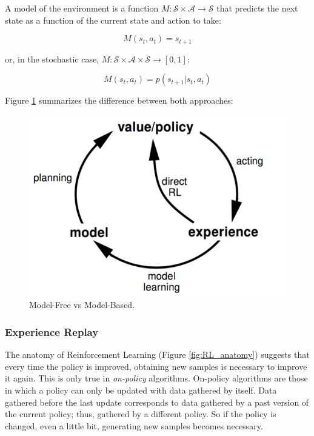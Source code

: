 A model of the environment is a function $M: \mathcal{S} \times \mathcal{A} \to \mathcal{S}$ that predicts the next state as a function of the current state and action to take:

\begin{equation} \label{eq:model}
    M(s_{t},a_{t}) = s_{t+1}  
\end{equation}

or, in the stochastic case, $M: \mathcal{S} \times \mathcal{A} \times \mathcal{S} \to [0, 1]$:

\begin{equation}
    M(s_{t},a_{t}) = p(s_{t+1}|s_{t},a_{t})  
\end{equation}

Figure \ref{fig:free_based_model} summarizes the difference between both approaches:

\begin{figure}[h]
    \centering
    \includegraphics[width=0.6\linewidth]{imagenes/cap1/free_based_model.png}
    \caption{Model-Free vs Model-Based.\protect\footnotemark}
    \label{fig:free_based_model}
\end{figure}

\subsubsection{Experience Replay \cite{atari, lin1993reinforcement, zhang2017deeper}}
\label{sss:ER}

The anatomy of Reinforcement Learning (Figure \ref{fig:RL_anatomy}) suggests that every time the policy is improved, obtaining new samples is necessary to improve it again. This is only true in \emph{on-policy} algorithms. On-policy algorithms are those in which a policy can only be updated with data gathered by itself. Data gathered before the last update corresponds to data gathered by a past version of the current policy; thus, gathered by a different policy. So if the policy is changed, even a little bit, generating new samples becomes necessary. 

